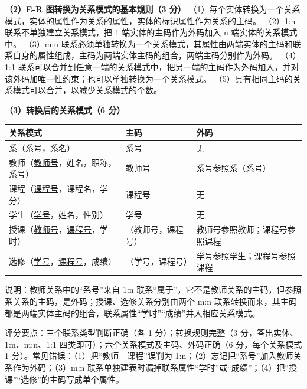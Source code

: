 \documentclass[a4paper,11pt]{article}
\begin{document}
\textbf{（2）E-R 图转换为关系模式的基本规则（3 分）}
（1）每个实体转换为一个关系模式，实体的属性作为关系的属性，实体的标识属性作为关系的主码。
（2）1:n 联系不单独建立关系模式，把 1 端实体的主码作为外码加入 n 端实体的关系模式中。
（3）m:n 联系必须单独转换为一个关系模式，其属性由两端实体的主码和联系自身的属性组成，主码为两端实体主码的组合，两端主码分别作为外码。
（4）1:1 联系可以合并到任意一端的关系模式中，把另一端的主码作为外码加入，并对该外码加唯一性约束；也可以单独转换为一个关系模式。
（5）具有相同主码的关系模式可以合并，以减少关系模式的个数。

\textbf{（3）转换后的关系模式（6 分）}
\begin{center}
\small
\begin{tabular}{@{}p{5.6cm}p{2.9cm}p{7.3cm}@{}}
\toprule
关系模式 & 主码 & 外码 \\
\midrule
系（\underline{系号}，系名） & 系号 & 无 \\
教师（\underline{教师号}，姓名，职称，系号） & 教师号 & 系号参照系（系号） \\
课程（\underline{课程号}，课程名，学分） & 课程号 & 无 \\
学生（\underline{学号}，姓名，性别） & 学号 & 无 \\
授课（\underline{教师号}，\underline{课程号}，学时） & （教师号，课程号） & 教师号参照教师；课程号参照课程 \\
选修（\underline{学号}，\underline{课程号}，成绩） & （学号，课程号） & 学号参照学生；课程号参照课程 \\
\bottomrule
\end{tabular}
\end{center}
说明：教师关系中的“系号”来自 1:n 联系“属于”，它不是教师关系的主码，但参照系关系的主码，是外码；授课、选修关系分别由两个 m:n 联系转换而来，其主码都是两端实体主码的组合，联系属性“学时”“成绩”并入相应关系模式。
\begin{analysis}评分要点：三个联系类型判断正确（各 1 分）；转换规则完整（3 分，答出实体、1:n、m:n、1:1 四类即可）；六个关系模式及主码、外码正确（6 分，每个关系模式 1 分）。常见错误：（1）把“教师—课程”误判为 1:n；（2）忘记把“系号”加入教师关系作为外码；（3）m:n 联系单独建表时漏掉联系属性“学时”或“成绩”；（4）把“授课”“选修”的主码写成单个属性。\end{analysis}
\end{document}
